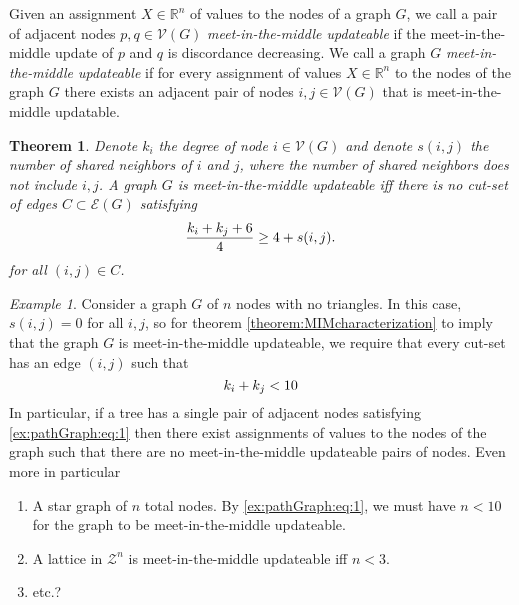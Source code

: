 \documentclass{article}
\newtheorem{theorem}{Theorem}
\theoremstyle{remark}
\newtheorem{example}{Example}
\newcommand{\R}[0]{\mathbb{R}}
\begin{document}
Given an assignment $X\in\R^n$ of values to the nodes of a graph $G$, we call a pair of adjacent nodes $p,q\in\mathcal{V}(G)$ \textit{meet-in-the-middle updateable} if the meet-in-the-middle update of $p$ and $q$ is discordance decreasing. We call a graph $G$ \textit{meet-in-the-middle updateable} if for every assignment of values $X\in\R^n$ to the nodes of the graph $G$ there exists an adjacent pair of nodes $i,j\in\mathcal{V}(G)$ that is meet-in-the-middle updatable.
\begin{theorem}{\label{theorem:MIMcharacterization}}
	Denote $k_i$ the degree of node $i\in\mathcal{V}(G)$ and denote $s(i,j)$ the number of shared neighbors of $i$ and $j$, where the number of shared neighbors does not include $i,j$. A graph $G$ is meet-in-the-middle updateable iff there is no cut-set of edges $C\subset\mathcal{E}(G)$ satisfying 
	\begin{equation}{\label{theorem:MIMcharacterization:eq:1}}
		\frac{k_i+k_j+6}{4} \geq 4 + s(i,j). 
	\end{equation}
for all $(i,j)\in C$.
\end{theorem}
\begin{example}{\label{ex:noTrianglesGraph}}
	Consider a graph $G$ of $n$ nodes with no triangles. In this case, $s(i,j)=0$ for all $i,j$, so for theorem \ref{theorem:MIMcharacterization} to imply that the graph $G$ is meet-in-the-middle updateable, we require that every cut-set has an edge $(i,j)$ such that
	\begin{equation}{\label{ex:pathGraph:eq:1}}
		k_i + k_j < 10
	\end{equation}
	In particular, if a tree has a single pair of adjacent nodes satisfying \eqref{ex:pathGraph:eq:1} then there exist assignments of values to the nodes of the graph such that there are no meet-in-the-middle updateable pairs of nodes. Even more in particular
	\begin{enumerate}
		\item A star graph of $n$ total nodes. By \eqref{ex:pathGraph:eq:1}, we must have $n<10$ for the graph to be meet-in-the-middle updateable.
		\item A lattice in $\mathcal{Z}^n$ is meet-in-the-middle updateable iff $n<3$.
		\item etc.?
	\end{enumerate}
\end{example}
\end{document}
